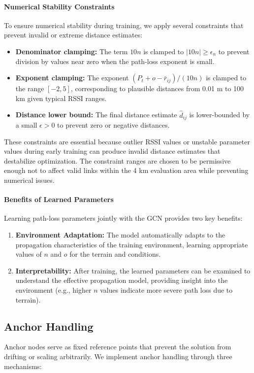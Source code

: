 \documentclass{ieeeaccess}
\begin{document}
\paragraph{Numerical Stability Constraints}
To ensure numerical stability during training, we apply several constraints that prevent invalid or extreme distance estimates:
\begin{itemize}
    \item \textbf{Denominator clamping:} The term $10n$ is clamped to $|10n| \geq \epsilon_n$ to prevent division by values near zero when the path-loss exponent is small.
    \item \textbf{Exponent clamping:} The exponent $(P_t + o - \bar{r}_{ij}) / (10n)$ is clamped to the range $[-2, 5]$, corresponding to plausible distances from 0.01 m to 100 km given typical RSSI ranges.
    \item \textbf{Distance lower bound:} The final distance estimate $\hat{d}_{ij}$ is lower-bounded by a small $\epsilon > 0$ to prevent zero or negative distances.
\end{itemize}
These constraints are essential because outlier RSSI values or unstable parameter values during early training can produce invalid distance estimates that destabilize optimization. The constraint ranges are chosen to be permissive enough not to affect valid links within the 4 km evaluation area while preventing numerical issues.

\paragraph{Benefits of Learned Parameters}
Learning path-loss parameters jointly with the GCN provides two key benefits:
\begin{enumerate}
    \item \textbf{Environment Adaptation:} The model automatically adapts to the propagation characteristics of the training environment, learning appropriate values of $n$ and $o$ for the terrain and conditions.
    \item \textbf{Interpretability:} After training, the learned parameters can be examined to understand the effective propagation model, providing insight into the environment (e.g., higher $n$ values indicate more severe path loss due to terrain).
\end{enumerate}

\subsection{Anchor Handling}
Anchor nodes serve as fixed reference points that prevent the solution from drifting or scaling arbitrarily. We implement anchor handling through three mechanisms:
\end{document}
